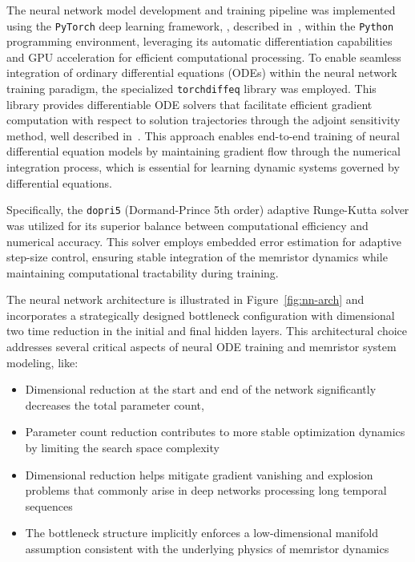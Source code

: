 \documentclass[11pt, oneside]{article}
\begin{document}
The neural network model development and training pipeline was implemented using the \texttt{PyTorch} deep learning framework, , described in~\cite{paszke2019pytorchimperativestylehighperformance}, within the \texttt{Python} programming environment, leveraging its automatic differentiation capabilities and GPU acceleration for efficient computational processing. To enable seamless integration of ordinary differential equations (ODEs) within the neural network training paradigm, the specialized \texttt{torchdiffeq} library was employed. This library provides differentiable ODE solvers that facilitate efficient gradient computation with respect to solution trajectories through the adjoint sensitivity method, well described in~\cite{Ricky2018, Ricky2021, torchdiffeq}. This approach enables end-to-end training of neural differential equation models by maintaining gradient flow through the numerical integration process, which is essential for learning dynamic systems governed by differential equations.

Specifically, the \texttt{dopri5} (Dormand-Prince 5th order) adaptive Runge-Kutta solver was utilized for its superior balance between computational efficiency and numerical accuracy. This solver employs embedded error estimation for adaptive step-size control, ensuring stable integration of the memristor dynamics while maintaining computational tractability during training.


The neural network architecture is illustrated in Figure~\ref{fig:nn-arch} and incorporates a strategically designed bottleneck configuration with dimensional two time reduction in the initial and final hidden layers. This architectural choice addresses several critical aspects of neural ODE training and memristor system modeling, like:
\begin{itemize}
    \item Dimensional reduction at the start and end of the network significantly decreases the total parameter count,
    \item  Parameter count reduction contributes to more stable optimization dynamics by limiting the search space complexity
    \item Dimensional reduction helps mitigate gradient vanishing and explosion problems that commonly arise in deep networks processing long temporal sequences
    \item  The bottleneck structure implicitly enforces a low-dimensional manifold assumption consistent with the underlying physics of memristor dynamics
\end{itemize}
\end{document}
